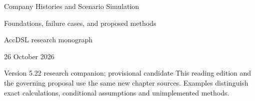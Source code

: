 \documentclass[11pt,a4paper]{report}
\begin{document}
\hypersetup{pageanchor=false}
\begin{titlepage}
{\Huge Company Histories and Scenario Simulation\par}
\vspace{12mm}
{\Large Foundations, failure cases, and proposed methods\par}
\vspace{8mm}
AccDSL research monograph\par 26 October 2026\par Version 5.22 research companion; provisional candidate
\vfill
This reading edition and the governing proposal use the same new chapter sources. Examples distinguish exact calculations, conditional assumptions and unimplemented methods.
\end{titlepage}
\hypersetup{pageanchor=true}
\tableofcontents
\clearpage{}


























\clearpage\label{sim:body-end}

\begingroup\raggedright
\endgroup
\end{document}
